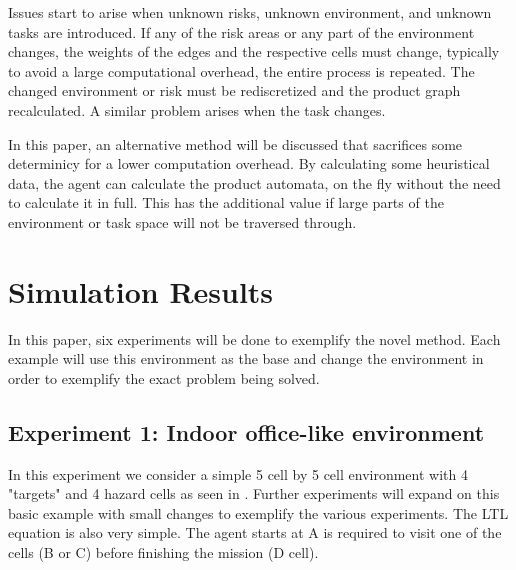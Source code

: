\documentclass[letter paper, 10 pt, conference]{ieeeconf}
\begin{document}
Issues start to arise when unknown risks, unknown environment, and unknown tasks are introduced. If any of the risk areas or any part of the environment changes, the weights of the edges and the respective cells must change, typically to avoid a large computational overhead, the entire process is repeated. The changed environment or risk must be rediscretized and the product graph recalculated. A similar problem arises when the task changes.

In this paper, an alternative method will be discussed that sacrifices some determinicy for a lower computation overhead. By calculating some heuristical data, the agent can calculate the product automata, on the fly without the need to calculate it in full. This has the additional value if large parts of the environment or task space will not be traversed through.


\section{Simulation Results}
In this paper, six experiments will be done to exemplify the novel method. Each example will use this environment as the base and change the environment in order to exemplify the exact problem being solved.

\subsection{Experiment 1: Indoor office-like environment}
In this experiment we consider a simple 5 cell by 5 cell environment with 4 "targets" and 4 hazard cells as seen in \fig{}. Further experiments will expand on this basic example with small changes to exemplify the various experiments. The LTL equation is also very simple. The agent starts at A is required to visit one of the cells (B or C) before finishing the mission (D cell).
\end{document}
